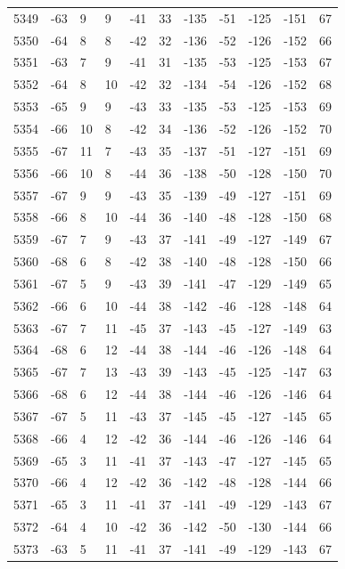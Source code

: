 \begin{table}[H]
\begin{tabular}{lllllllllll}
5349 & -63 & 9 & 9 & -41 & 33 & -135 & -51 & -125 & -151 & 67 \\
5350 & -64 & 8 & 8 & -42 & 32 & -136 & -52 & -126 & -152 & 66 \\
5351 & -63 & 7 & 9 & -41 & 31 & -135 & -53 & -125 & -153 & 67 \\
5352 & -64 & 8 & 10 & -42 & 32 & -134 & -54 & -126 & -152 & 68 \\
5353 & -65 & 9 & 9 & -43 & 33 & -135 & -53 & -125 & -153 & 69 \\
5354 & -66 & 10 & 8 & -42 & 34 & -136 & -52 & -126 & -152 & 70 \\
5355 & -67 & 11 & 7 & -43 & 35 & -137 & -51 & -127 & -151 & 69 \\
5356 & -66 & 10 & 8 & -44 & 36 & -138 & -50 & -128 & -150 & 70 \\
5357 & -67 & 9 & 9 & -43 & 35 & -139 & -49 & -127 & -151 & 69 \\
5358 & -66 & 8 & 10 & -44 & 36 & -140 & -48 & -128 & -150 & 68 \\
5359 & -67 & 7 & 9 & -43 & 37 & -141 & -49 & -127 & -149 & 67 \\
5360 & -68 & 6 & 8 & -42 & 38 & -140 & -48 & -128 & -150 & 66 \\
5361 & -67 & 5 & 9 & -43 & 39 & -141 & -47 & -129 & -149 & 65 \\
5362 & -66 & 6 & 10 & -44 & 38 & -142 & -46 & -128 & -148 & 64 \\
5363 & -67 & 7 & 11 & -45 & 37 & -143 & -45 & -127 & -149 & 63 \\
5364 & -68 & 6 & 12 & -44 & 38 & -144 & -46 & -126 & -148 & 64 \\
5365 & -67 & 7 & 13 & -43 & 39 & -143 & -45 & -125 & -147 & 63 \\
5366 & -68 & 6 & 12 & -44 & 38 & -144 & -46 & -126 & -146 & 64 \\
5367 & -67 & 5 & 11 & -43 & 37 & -145 & -45 & -127 & -145 & 65 \\
5368 & -66 & 4 & 12 & -42 & 36 & -144 & -46 & -126 & -146 & 64 \\
5369 & -65 & 3 & 11 & -41 & 37 & -143 & -47 & -127 & -145 & 65 \\
5370 & -66 & 4 & 12 & -42 & 36 & -142 & -48 & -128 & -144 & 66 \\
5371 & -65 & 3 & 11 & -41 & 37 & -141 & -49 & -129 & -143 & 67 \\
5372 & -64 & 4 & 10 & -42 & 36 & -142 & -50 & -130 & -144 & 66 \\
5373 & -63 & 5 & 11 & -41 & 37 & -141 & -49 & -129 & -143 & 67 \\

\end{tabular}
\end{table}
